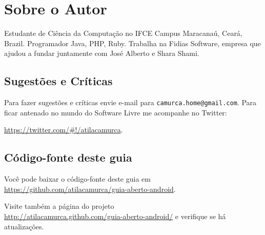 \chapter{Sobre o Autor}

Estudante de Ciência da Computação no IFCE Campus Maracanaú, Ceará,
Brazil. Programador Java, PHP, Ruby. Trabalha na Fidias Software,
empresa que ajudou a fundar juntamente com José Alberto e Shara Shami.

\section{Sugestões e Críticas}

Para fazer sugestões e críticas envie e-mail para
\texttt{camurca.home@gmail.com}. Para ficar antenado no mundo do
Software Livre me acompanhe no Twitter:

\url{https://twitter.com/#!/atilacamurca}.

\section{Código-fonte deste guia}

Você pode baixar o código-fonte deste guia
em\\\url{https://github.com/atilacamurca/guia-aberto-android}.

Visite também a página do
projeto\\\url{http://atilacamurca.github.com/guia-aberto-android/} e
verifique se há atualizações.
